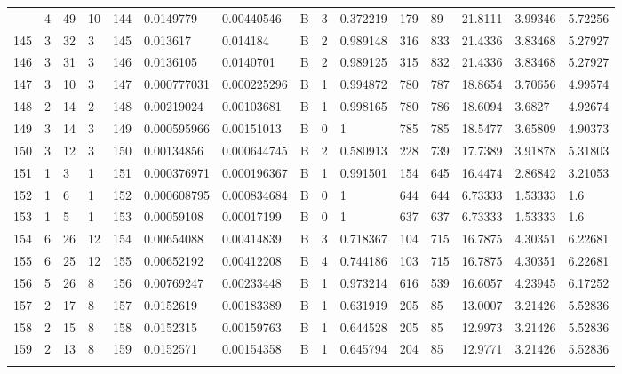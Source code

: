 \begin{latin}
\begin{longtable}{lllllllllllllll}
\begin{comment}
	144 & 4  & 49  & 10 & 144 & 0.0149779      & 0.00440546     & B & 3  & 0.372219 & 179  & 89   & 21.8111 & 3.99346 & 5.72256 \\
	145 & 3  & 32  & 3  & 145 & 0.013617       & 0.014184       & B & 2  & 0.989148 & 316  & 833  & 21.4336 & 3.83468 & 5.27927 \\
	146 & 3  & 31  & 3  & 146 & 0.0136105      & 0.0140701      & B & 2  & 0.989125 & 315  & 832  & 21.4336 & 3.83468 & 5.27927 \\
	147 & 3  & 10  & 3  & 147 & 0.000777031    & 0.000225296    & B & 1  & 0.994872 & 780  & 787  & 18.8654 & 3.70656 & 4.99574 \\
	148 & 2  & 14  & 2  & 148 & 0.00219024     & 0.00103681     & B & 1  & 0.998165 & 780  & 786  & 18.6094 & 3.6827  & 4.92674 \\
	149 & 3  & 14  & 3  & 149 & 0.000595966    & 0.00151013     & B & 0  & 1        & 785  & 785  & 18.5477 & 3.65809 & 4.90373 \\
	150 & 3  & 12  & 3  & 150 & 0.00134856     & 0.000644745    & B & 2  & 0.580913 & 228  & 739  & 17.7389 & 3.91878 & 5.31803 \\
	151 & 1  & 3   & 1  & 151 & 0.000376971    & 0.000196367    & B & 1  & 0.991501 & 154  & 645  & 16.4474 & 2.86842 & 3.21053 \\
	152 & 1  & 6   & 1  & 152 & 0.000608795    & 0.000834684    & B & 0  & 1        & 644  & 644  & 6.73333 & 1.53333 & 1.6     \\
	153 & 1  & 5   & 1  & 153 & 0.00059108     & 0.00017199     & B & 0  & 1        & 637  & 637  & 6.73333 & 1.53333 & 1.6     \\
	154 & 6  & 26  & 12 & 154 & 0.00654088     & 0.00414839     & B & 3  & 0.718367 & 104  & 715  & 16.7875 & 4.30351 & 6.22681 \\
	155 & 6  & 25  & 12 & 155 & 0.00652192     & 0.00412208     & B & 4  & 0.744186 & 103  & 715  & 16.7875 & 4.30351 & 6.22681 \\
	156 & 5  & 26  & 8  & 156 & 0.00769247     & 0.00233448     & B & 1  & 0.973214 & 616  & 539  & 16.6057 & 4.23945 & 6.17252 \\
	157 & 2  & 17  & 8  & 157 & 0.0152619      & 0.00183389     & B & 1  & 0.631919 & 205  & 85   & 13.0007 & 3.21426 & 5.52836 \\
	158 & 2  & 15  & 8  & 158 & 0.0152315      & 0.00159763     & B & 1  & 0.644528 & 205  & 85   & 12.9973 & 3.21426 & 5.52836 \\
	159 & 2  & 13  & 8  & 159 & 0.0152571      & 0.00154358     & B & 1  & 0.645794 & 204  & 85   & 12.9771 & 3.21426 & 5.52836 \\

\end{comment}
\end{longtable}
\end{latin}
